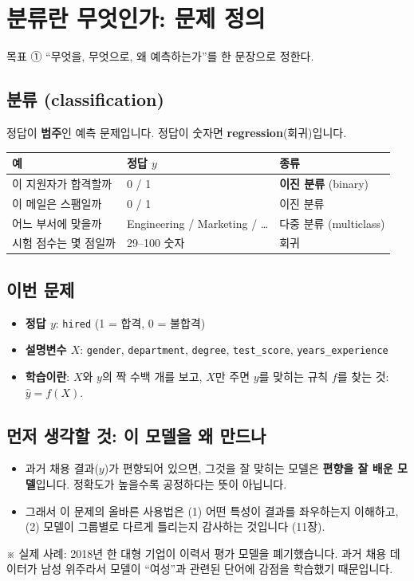 \documentclass[11pt,a4paper]{article}
\newcommand{\term}[1]{\textbf{#1}}
\newcommand{\code}[1]{\texttt{#1}}
\newcommand{\aside}[1]{{\footnotesize\color{black!65}#1}}
\begin{document}
\section{분류란 무엇인가: 문제 정의}
\begin{goalbox}{목표 \quad ①}
``무엇을, 무엇으로, 왜 예측하는가''를 한 문장으로 정한다.
\end{goalbox}

\subsection{분류 (classification)}
정답이 \textbf{범주}인 예측 문제입니다. 정답이 숫자면 \term{regression}(회귀)입니다.
\begin{center}\small
\begin{tabular}{@{}l l l@{}}
\toprule
예 & 정답 $y$ & 종류 \\
\midrule
이 지원자가 합격할까 & 0 / 1 & \textbf{이진 분류} (binary) \\
이 메일은 스팸일까 & 0 / 1 & 이진 분류 \\
어느 부서에 맞을까 & Engineering / Marketing / \dots & 다중 분류 (multiclass) \\
시험 점수는 몇 점일까 & 29–100 숫자 & 회귀 \\
\bottomrule
\end{tabular}
\end{center}

\subsection{이번 문제}
\begin{itemize}
\item \textbf{정답 $y$}: \code{hired} (1 = 합격, 0 = 불합격)
\item \textbf{설명변수 $X$}: \code{gender}, \code{department}, \code{degree}, \code{test\_score}, \code{years\_experience}
\item \textbf{학습이란}: $X$와 $y$의 짝 수백 개를 보고, $X$만 주면 $y$를 맞히는 규칙 $f$를 찾는 것: $\hat y=f(X)$.
\end{itemize}

\subsection{먼저 생각할 것: 이 모델을 왜 만드나}
\begin{itemize}
\item 과거 채용 결과($y$)가 편향되어 있으면, 그것을 잘 맞히는 모델은 \textbf{편향을 잘 배운 모델}입니다. 정확도가 높을수록 공정하다는 뜻이 아닙니다.
\item 그래서 이 문제의 올바른 사용법은 (1) 어떤 특성이 결과를 좌우하는지 이해하고, (2) 모델이 그룹별로 다르게 틀리는지 감사하는 것입니다 (11장).
\end{itemize}
\aside{※ 실제 사례: 2018년 한 대형 기업이 이력서 평가 모델을 폐기했습니다. 과거 채용 데이터가 남성 위주라서 모델이 ``여성''과 관련된 단어에 감점을 학습했기 때문입니다.}
\end{document}
